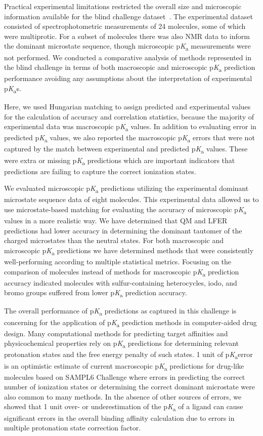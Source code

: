 \documentclass[9pt,lineno,final]{elife}
\newcommand{\pKa}{p\textit{K}\textsubscript{a}}
\begin{document}
Practical experimental limitations restricted the overall size and microscopic information available for the blind challenge dataset~\cite{Isik:2018:J.Comput.AidedMol.Des.}.
The experimental dataset consisted of spectrophotometric measurements of 24 molecules, some of which were multiprotic. 
For a subset of molecules there was also NMR data to inform the dominant microstate sequence, though microscopic \pKa{} measurements were not performed. 
We conducted a comparative analysis of methods represented in the blind challenge in terms of both macroscopic and microscopic \pKa{} prediction performance avoiding any assumptions about the interpretation of experimental \pKa{}s. 

Here, we used Hungarian matching to assign predicted and experimental values for the calculation of accuracy and correlation statistics, because the majority of experimental data was macroscopic \pKa{} values. 
In addition to evaluating error in predicted \pKa{} values, we also reported the macroscopic \pKa{} errors that were not captured by the match between experimental and predicted \pKa{} values. 
These were extra or missing \pKa{} predictions which are important indicators that predictions are failing to capture the correct ionization states. 

We evaluated microscopic \pKa{} predictions utilizing the experimental dominant microstate sequence data of eight molecules. 
This experimental data allowed us to use microstate-based matching for evaluating the accuracy of microscopic \pKa{} values in a more realistic way. 
We have determined that QM and LFER predictions had lower accuracy in determining the dominant tautomer of the charged microstates than the neutral states. 
For both macroscopic and microscopic \pKa{} predictions we have determined methods that were consistently well-performing according to multiple statistical metrics. 
Focusing on the comparison of molecules instead of methods for macroscopic \pKa{} prediction accuracy indicated molecules with sulfur-containing heterocycles, iodo, and bromo groups suffered from lower \pKa{} prediction accuracy. 

The overall performance of \pKa{} predictions as captured in this challenge is concerning for the application of \pKa{} prediction methods in computer-aided drug design. 
Many computational methods for predicting target affinities and physicochemical properties rely on \pKa{} predictions for determining relevant protonation states and the free energy penalty of such states. 
1 unit of \pKa error is an optimistic estimate of current macroscopic \pKa{} predictions for drug-like molecules based on SAMPL6 Challenge where errors in predicting the correct number of ionization states or determining the correct dominant microstate were also common to many methods.
In the absence of other sources of errors, we showed that 1 unit over- or underestimation of the \pKa{} of a ligand can cause significant errors in the overall binding affinity calculation due to errors in multiple protonation state correction factor. 
\end{document}
